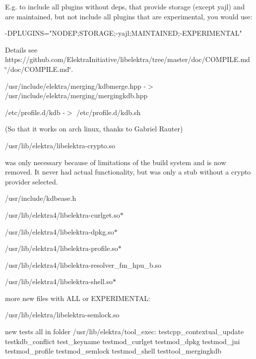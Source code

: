 E.\+g. to include all plugins without deps, that provide storage (except yajl) and are maintained, but not include all plugins that are experimental, you would use\+:


\begin{DoxyCode}
-DPLUGINS="NODEP;STORAGE;-yajl;MAINTAINED;-EXPERIMENTAL"
\end{DoxyCode}


Details see https\+://github.com/\+Elektra\+Initiative/libelektra/tree/master/doc/\+C\+O\+M\+P\+I\+L\+E.\+md \char`\"{}/doc/\+C\+O\+M\+P\+I\+L\+E.\+md\char`\"{}.

/usr/include/elektra/merging/kdbmerge.hpp -\/$>$ /usr/include/elektra/merging/mergingkdb.hpp

/etc/profile.d/kdb -\/$>$ /etc/profile.d/kdb.\+sh

(So that it works on arch linux, thanks to Gabriel Rauter)


\begin{DoxyItemize}
\item /usr/lib/elektra/libelektra-\/crypto.so
\end{DoxyItemize}

was only necessary because of limitations of the build system and is now removed. It never had actual functionality, but was only a stub without a crypto provider selected.


\begin{DoxyItemize}
\item {\ttfamily /usr/include/kdbease.h}
\item {\ttfamily /usr/lib/elektra4/libelektra-\/curlget.so$\ast$}
\item {\ttfamily /usr/lib/elektra4/libelektra-\/dpkg.so$\ast$}
\item {\ttfamily /usr/lib/elektra4/libelektra-\/profile.so$\ast$}
\item {\ttfamily /usr/lib/elektra4/libelektra-\/resolver\+\_\+fm\+\_\+hpu\+\_\+b.so}
\item {\ttfamily /usr/lib/elektra4/libelektra-\/shell.so$\ast$}
\end{DoxyItemize}

more new files with A\+LL or E\+X\+P\+E\+R\+I\+M\+E\+N\+T\+AL\+:


\begin{DoxyItemize}
\item /usr/lib/elektra/libelektra-\/semlock.so
\end{DoxyItemize}

new tests all in folder /usr/lib/elektra/tool\+\_\+exec\+: testcpp\+\_\+contextual\+\_\+update testkdb\+\_\+conflict test\+\_\+keyname testmod\+\_\+curlget testmod\+\_\+dpkg testmod\+\_\+jni testmod\+\_\+profile testmod\+\_\+semlock testmod\+\_\+shell testtool\+\_\+mergingkdb

